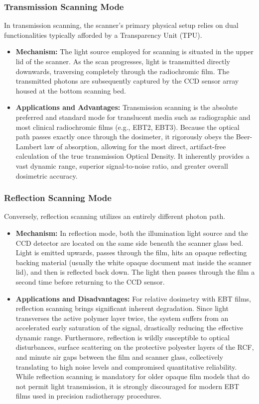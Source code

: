 \subsubsection{Transmission Scanning Mode}
In transmission scanning, the scanner's primary physical setup relies on dual functionalities typically afforded by a Transparency Unit (TPU). 
\begin{itemize}
    \item \textbf{Mechanism:} The light source employed for scanning is situated in the upper lid of the scanner. As the scan progresses, light is transmitted directly downwards, traversing completely through the radiochromic film. The transmitted photons are subsequently captured by the CCD sensor array housed at the bottom scanning bed.
    \item \textbf{Applications and Advantages:} Transmission scanning is the absolute preferred and standard mode for translucent media such as radiographic and most clinical radiochromic films (e.g., EBT2, EBT3). Because the optical path passes exactly once through the dosimeter, it rigorously obeys the Beer-Lambert law of absorption, allowing for the most direct, artifact-free calculation of the true transmission Optical Density. It inherently provides a vast dynamic range, superior signal-to-noise ratio, and greater overall dosimetric accuracy. 
\end{itemize}

\subsubsection{Reflection Scanning Mode}
Conversely, reflection scanning utilizes an entirely different photon path.
\begin{itemize}
    \item \textbf{Mechanism:} In reflection mode, both the illumination light source and the CCD detector are located on the same side beneath the scanner glass bed. Light is emitted upwards, passes through the film, hits an opaque reflecting backing material (usually the white opaque document mat inside the scanner lid), and then is reflected back down. The light then passes through the film a second time before returning to the CCD sensor.
    \item \textbf{Applications and Disadvantages:} For relative dosimetry with EBT films, reflection scanning brings significant inherent degradation. Since light transverses the active polymer layer twice, the system suffers from an accelerated early saturation of the signal, drastically reducing the effective dynamic range. Furthermore, reflection is wildly susceptible to optical disturbances, surface scattering on the protective polyester layers of the RCF, and minute air gaps between the film and scanner glass, collectively translating to high noise levels and compromised quantitative reliability. 
    While reflection scanning is mandatory for older opaque film models that do not permit light transmission, it is strongly discouraged for modern EBT films used in precision radiotherapy procedures.
\end{itemize}


